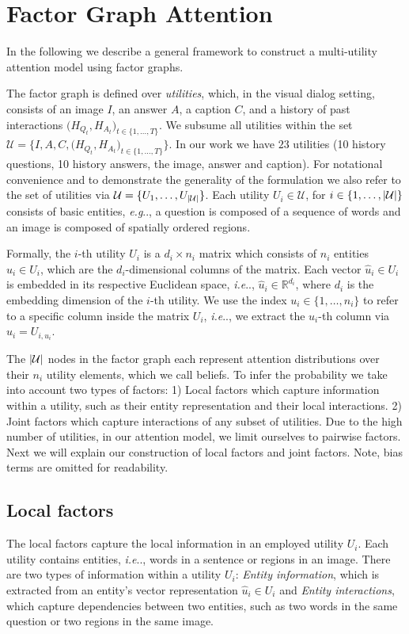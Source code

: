 \documentclass[10pt,twocolumn,letterpaper]{article}
\makeatletter
\def\@onedot{\ifx\@let@token.\else.\null\fi\xspace}
\DeclareRobustCommand\onedot{\futurelet\@let@token\@onedot}
\def\eg{\emph{e.g}\onedot} \def\Eg{\emph{E.g}\onedot}
\def\ie{\emph{i.e}\onedot} \def\Ie{\emph{I.e}\onedot}
\makeatother
\begin{document}
\section{Factor Graph Attention}
\label{sec:FGA}
In the following we describe a general framework to construct a multi-utility attention model using factor graphs. 

The factor graph is defined over \textit{utilities}, which, in the visual dialog setting, consists of an image $I$, an answer $A$, a caption $C$, and a history of past interactions $\big( H_{Q_t}, H_{A_t} \big)_{t\in\{1, \ldots, T\}}$. We subsume all utilities within the set $\mathcal{U} = \{I,A,C,\big( H_{Q_t}, H_{A_t}\big)_{t \in \{1, \ldots, T\}}\}$. In our work we have $23$ utilities (10 history questions, 10 history answers, the image, answer and caption). For notational convenience and to demonstrate the generality of the formulation we also refer to the set of utilities via  ${\cal U} = \{U_1,\ldots,U_{|{\cal U}|}\}$. Each utility $U_i \in {\mathcal{U}}$, for $i\in\{1, \ldots, |{\cal U}|\}$ consists of basic entities, \eg, a question is composed of a sequence of words and an image is composed  of spatially ordered regions. 


Formally, the $i$-th utility  $U_i$ is a $d_i \times n_i$ matrix which consists of $n_i$ entities $\hat u_i \in U_{i}$, which are the $d_i$-dimensional columns of the matrix. Each vector $\hat u_i\in U_i$ is embedded in its respective Euclidean space, \ie, $\hat u_i \in \mathbb{R}^{d_i}$, where $d_i$ is the embedding dimension of the $i$-th utility.  We use the index $u_i\in\{1, \ldots, n_i\}$ to refer to a specific column inside the matrix $U_i$, \ie, we extract the $u_i$-th column via $\hat u_i = U_{i, u_i}$. 

The $|{\cal U}|$ nodes in the factor graph each represent attention distributions over their $n_i$ utility  elements, which we call beliefs. To infer the probability we take into account two types of factors: 1) Local factors which capture information within a utility, such as their entity representation and their local interactions. 2) Joint factors which capture interactions of any subset of utilities. Due to the high number of utilities,  in our attention model, we limit ourselves to pairwise factors. Next we will explain our construction of local factors and joint factors. Note, bias terms are omitted for readability. 





\subsection{Local factors} 
\label{sec:local}
The local factors capture the local information in an employed utility $U_i$. Each utility contains entities, \ie, words in a sentence or regions in an image. There are two types of information within a utility $U_i$: \textit{Entity information}, which is extracted from an entity's vector representation $\hat u_i\in U_i$ and \textit{Entity interactions}, which  capture dependencies between two entities, such as two words in the same question or two regions in the same image. 
\end{document}
